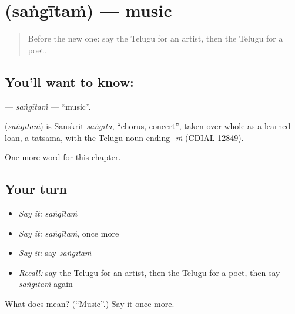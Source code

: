 \section[\texorpdfstring{\te{సంగీతం} (saṅgītaṁ)}{సంగీతం (saṅgītaṁ)}]{ (saṅgītaṁ) — music}

\label{lesson:TE-C275-sangitam}



\begin{quote}
Before the new one: say the Telugu for an artist, then the Telugu for a poet.
\end{quote}

\subsection*{You'll want to know: }
\textbf{} — \emph{saṅgītaṁ} — \textquotedblleft{}music\textquotedblright{}.

\begin{cousinweb}
\textbf{} (\emph{saṅgītaṁ}) is Sanskrit \emph{saṅgīta}, \textquotedblleft{}chorus, concert\textquotedblright{}, taken over whole as a learned loan, a tatsama, with the Telugu noun ending \emph{-ṁ} (CDIAL 12849).
\end{cousinweb}

\begin{grammarlens}[title={What you've built}]
One more word for this chapter.
\end{grammarlens}

\subsection*{Your turn}
\begin{itemize}
\raggedright
  \item \emph{Say it:} \emph{saṅgītaṁ}
  \item \emph{Say it:} \emph{saṅgītaṁ}, once more
  \item \emph{Say it:} say \emph{saṅgītaṁ}
  \item \emph{Recall:} say the Telugu for an artist, then the Telugu for a poet, then say \emph{saṅgītaṁ} again
\end{itemize}

\begin{tcolorbox}[breakable,colback=teal!4,colframe=teal!35!black,title={Before you move on}]
What does  mean? (\textquotedblleft{}Music\textquotedblright{}.) Say it once more.
\end{tcolorbox}
